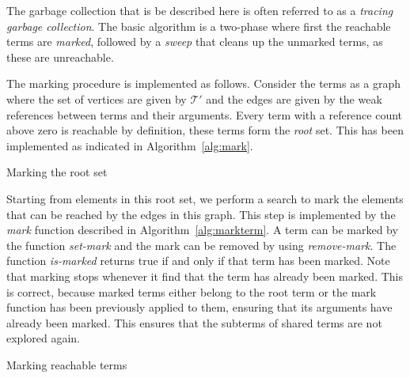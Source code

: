 \documentclass[10pt,a4paper]{article}
\theoremstyle{definition}
\newcommand{\terms}{\mathcal{T}}
\begin{document}
The garbage collection that is be described here is often referred to as a \emph{tracing garbage collection}. 
The basic algorithm is a two-phase where first the reachable terms are \emph{marked}, followed by a \emph{sweep} that cleans up the unmarked terms, as these are unreachable.

The marking procedure is implemented as follows.
Consider the terms as a graph where the set of vertices are given by $\terms'$ and the edges are given by the weak references between terms and their arguments.
Every term with a reference count above zero is reachable by definition, these terms form the \emph{root} set.
This has been implemented as indicated in Algorithm~\ref{alg:mark}.

\begin{algorithm}[H]
  \caption{Marking the root set}\label{alg:mark}
  \begin{algorithmic}[1]
      \EndIf
    \EndFor
    \EndProcedure
  \end{algorithmic}
\end{algorithm}

\noindent Starting from elements in this root set, we perform a search to mark the elements that can be reached by the edges in this graph.
This step is implemented by the \emph{mark} function described in Algorithm~\ref{alg:markterm}.
A term can be marked by the function \emph{set-mark} and the mark can be removed by using \emph{remove-mark}.
The function \emph{is-marked} returns true if and only if that term has been marked.
Note that marking stops whenever it find that the term has already been marked.
This is correct, because marked terms either belong to the root term or the mark function has been previously applied to them, ensuring that its arguments have already been marked.
This ensures that the subterms of shared terms are not explored again.

\begin{algorithm}[H]
  \caption{Marking reachable terms}\label{alg:markterm}
  \begin{algorithmic}[1]
    \Procedure{Mark}{$t : \terms'$}
    
      \EndFor
    \EndIf
    \EndProcedure
  \end{algorithmic}
\end{algorithm}
\end{document}
